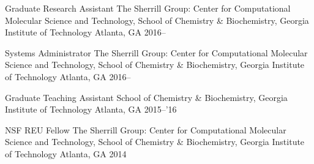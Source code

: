 



\begin{cvhonors}

  \cvhonor
    {Graduate Research Assistant} %
    {The Sherrill Group: Center for Computational Molecular Science and Technology,
    School of Chemistry \& Biochemistry, Georgia Institute of Technology} %
    {Atlanta, GA} %
    {2016--} %


  \cvhonor
    {Systems Administrator} %
    {The Sherrill Group: Center for Computational Molecular Science and Technology,
    School of Chemistry \& Biochemistry, Georgia Institute of Technology} %
    {Atlanta, GA} %
    {2016--} %

  \cvhonor
    {Graduate Teaching Assistant} %
    {School of Chemistry \& Biochemistry, Georgia Institute of Technology} %
    {Atlanta, GA} %
    {2015--'16} %


  \cvhonor
    {NSF REU Fellow} %
    {The Sherrill Group: Center for Computational Molecular Science and Technology,
    School of Chemistry \& Biochemistry, Georgia Institute of Technology} %
    {Atlanta, GA} %
    {2014} %

\end{cvhonors}

